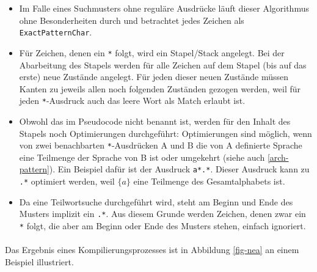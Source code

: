 \begin{itemize}
 \item Im Falle eines Suchmusters ohne reguläre Ausdrücke läuft dieser Algorithmus ohne Besonderheiten durch und betrachtet jedes Zeichen als \\\texttt{ExactPatternChar}.
 \item Für Zeichen, denen ein \texttt{*} folgt, wird ein Stapel/Stack angelegt. Bei der Abarbeitung des Stapels werden für alle Zeichen auf dem Stapel (bis auf das erste) neue Zustände angelegt. Für jeden dieser neuen Zustände müssen Kanten zu jeweils allen noch folgenden Zuständen gezogen werden, weil für jeden \texttt{*}-Ausdruck auch das leere Wort als Match erlaubt ist.
 \item Obwohl das im Pseudocode nicht benannt ist, werden für den Inhalt des Stapels noch Optimierungen durchgeführt: Optimierungen sind möglich, wenn von zwei benachbarten \texttt{*}-Ausdrücken A und B die von A definierte Sprache eine Teilmenge der Sprache von B ist oder umgekehrt (siehe auch \ref{arch-pattern}). Ein Beispiel dafür ist der Ausdruck \texttt{a*.*}. Dieser Ausdruck kann zu \texttt{.*} optimiert werden, weil $\lbrace a\rbrace$ eine Teilmenge des Gesamtalphabets ist.
 \item Da eine Teilwortsuche durchgeführt wird, steht am Beginn und Ende des Musters implizit ein \texttt{.*}. Aus diesem Grunde werden Zeichen, denen zwar ein \texttt{*} folgt, die aber am Beginn oder Ende des Musters stehen, einfach ignoriert.
\end{itemize}

\paragraph{} Das Ergebnis eines Kompilierungsprozesses ist in Abbildung \ref{fig-nea} an einem Beispiel illustriert.

